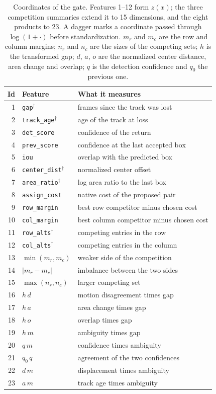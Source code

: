 \begin{table}[t]
\centering
\footnotesize
\setlength{\tabcolsep}{4pt}
\caption{Coordinates of the gate. Features 1--12 form $z(x)$; the three
competition summaries extend it to 15 dimensions, and the eight products
to 23. A dagger marks a coordinate passed through $\log(1+\cdot)$ before
standardization. $m_r$ and $m_c$ are the row and column margins;
$n_r$ and $n_c$ are the sizes of the competing sets; $h$ is the transformed
gap; $d$, $a$, $o$ are the normalized center distance, area change and
overlap; $q$ is the detection confidence and $q_0$ the previous one.}
\label{tab:features}
\begin{tabular}{rll}
\hline
Id & Feature & What it measures \\
\hline
1 & \texttt{gap}$^\dagger$ & frames since the track was lost \\
2 & \texttt{track\_age}$^\dagger$ & age of the track at loss \\
3 & \texttt{det\_score} & confidence of the return \\
4 & \texttt{prev\_score} & confidence at the last accepted box \\
5 & \texttt{iou} & overlap with the predicted box \\
6 & \texttt{center\_dist}$^\dagger$ & normalized center offset \\
7 & \texttt{area\_ratio}$^\dagger$ & log area ratio to the last box \\
8 & \texttt{assign\_cost} & native cost of the proposed pair \\
9 & \texttt{row\_margin} & best row competitor minus chosen cost \\
10 & \texttt{col\_margin} & best column competitor minus chosen cost \\
11 & \texttt{row\_alts}$^\dagger$ & competing entries in the row \\
12 & \texttt{col\_alts}$^\dagger$ & competing entries in the column \\
\hline
13 & $\min(m_r,m_c)$ & weaker side of the competition \\
14 & $|m_r-m_c|$ & imbalance between the two sides \\
15 & $\max(n_r,n_c)$ & larger competing set \\
16 & $h\,d$ & motion disagreement times gap \\
17 & $h\,a$ & area change times gap \\
18 & $h\,o$ & overlap times gap \\
19 & $h\,m$ & ambiguity times gap \\
20 & $q\,m$ & confidence times ambiguity \\
21 & $q_0\,q$ & agreement of the two confidences \\
22 & $d\,m$ & displacement times ambiguity \\
23 & $a\,m$ & track age times ambiguity \\
\hline
\end{tabular}
\end{table}

